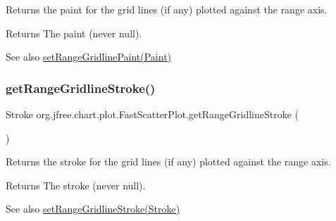 Returns the paint for the grid lines (if any) plotted against the range axis.

\begin{DoxyReturn}{Returns}
The paint (never {\ttfamily null}).
\end{DoxyReturn}
\begin{DoxySeeAlso}{See also}
\mbox{\hyperlink{classorg_1_1jfree_1_1chart_1_1plot_1_1_fast_scatter_plot_ac05c849d6e0f0e6b35a2f7e8ba0d8d43}{set\+Range\+Gridline\+Paint(\+Paint)}} 
\end{DoxySeeAlso}
\mbox{\label{classorg_1_1jfree_1_1chart_1_1plot_1_1_fast_scatter_plot_a4c4cc7c68b1bf7c7396d3d7cd8aff979}} 
\subsubsection{\texorpdfstring{get\+Range\+Gridline\+Stroke()}{getRangeGridlineStroke()}}
{\footnotesize\ttfamily Stroke org.\+jfree.\+chart.\+plot.\+Fast\+Scatter\+Plot.\+get\+Range\+Gridline\+Stroke (\begin{DoxyParamCaption}{ }\end{DoxyParamCaption})}

Returns the stroke for the grid lines (if any) plotted against the range axis.

\begin{DoxyReturn}{Returns}
The stroke (never {\ttfamily null}).
\end{DoxyReturn}
\begin{DoxySeeAlso}{See also}
\mbox{\hyperlink{classorg_1_1jfree_1_1chart_1_1plot_1_1_fast_scatter_plot_ac3387d82602cc9d59ecf2407b624045f}{set\+Range\+Gridline\+Stroke(\+Stroke)}} 
\end{DoxySeeAlso}
\mbox{\label{classorg_1_1jfree_1_1chart_1_1plot_1_1_fast_scatter_plot_a17ba5d81c14e9d1c1bf4c26e14cdcbaa}} 
